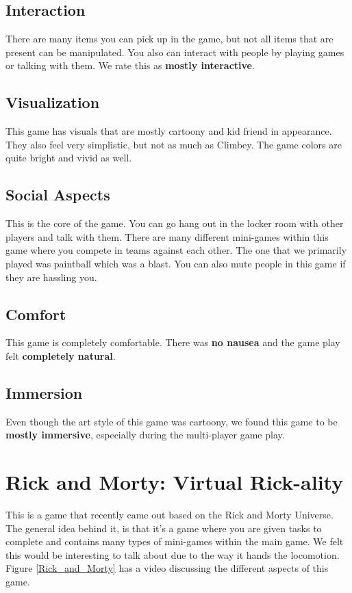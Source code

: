 \documentclass[journal]{IEEEtran}
\begin{document}
\subsection{Interaction}
There are many items you can pick up in the game, but not all items that are present can be manipulated. You also can interact with people by playing games or talking with them. We rate this as \textbf{mostly interactive}.
\subsection{Visualization}
This game has visuals that are mostly cartoony and kid friend in appearance. They also feel very simplistic, but not as much as Climbey. The game colors are quite bright and vivid as well. 
\subsection{Social Aspects}
This is the core of the game. You can go hang out in the locker room with other players and talk with them. There are many different mini-games within this game where you compete in teams against each other. The one that we primarily played was paintball which was a blast. You can also mute people in this game if they are hassling you. 
\subsection{Comfort}
This game is completely comfortable. There was \textbf{no  nausea} and the game play felt \textbf{completely natural}.

\subsection{Immersion}
Even though the art style of this game was cartoony, we found this game to be \textbf{mostly immersive}, especially during the multi-player game play. 


\section{Rick and Morty: Virtual Rick-ality}
This is a game that recently came out based on the Rick and Morty Universe. The general idea behind it, is that it's a game where you are given tasks to complete and contains many types of mini-games within the main game. We felt this would be interesting to talk about due to the way it hands the locomotion. Figure \ref{Rick_and_Morty} has a video discussing the different aspects of this game. 
\end{document}
